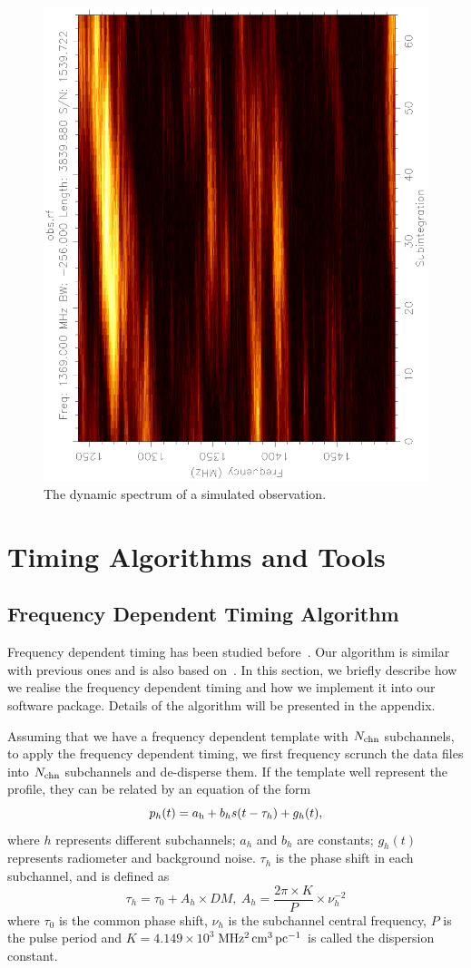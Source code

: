 \documentclass[useAMS,usenatbib]{mn2e}
\begin{document}
\begin{figure}
\begin{center}
\includegraphics[width=2.5 in,angle=-90]{obsDyn.ps}
\end{center}
\caption{The dynamic spectrum of a simulated observation.}
\label{obs2}
\end{figure}

\section{Timing Algorithms and Tools}

\subsection{Frequency Dependent Timing Algorithm}

Frequency dependent timing has been studied before~\citep{Pennucci14,Liu14}. 
Our algorithm is similar with previous ones and is also based on~\citet{Taylor92}.
%
In this section, we briefly describe how we realise the frequency dependent 
timing and how we implement it into our software package. Details of the 
algorithm will be presented in the appendix.
%

Assuming that we have a frequency dependent template with $N_{\rm{chn}}$ subchannels, 
to apply the frequency dependent timing, we first frequency scrunch the data 
files into $N_{\rm{chn}}$ subchannels and de-disperse them.
%
If the template well represent the profile, they can be related by an 
equation of the form
%
\begin{equation}
p_{h}(t)=a_{\rm{h}}+b_{h}s(t-\tau_{h})+g_{h}(t),
\end{equation}
%
where $h$ represents different subchannels; $a_{h}$ and $b_{h}$ are constants; 
$g_{h}(t)$ represents radiometer and background noise.
%
$\tau_{h}$ is the phase shift in each subchannel, and is defined as
%
\begin{equation}
\tau_{h}=\tau_{0}+A_{h}\times DM,\ A_{h}=\frac{2\pi\times K}{P}\times\nu_{h}^{-2}
\end{equation}
%
where $\tau_{0}$ is the common phase shift, $\nu_{h}$ is the subchannel central 
frequency, $P$ is the pulse period and $K=4.149\times 10^{3}$\,$\rm{MHz^{2}\,cm^{3}\,pc^{-1}}$ 
is called the dispersion constant.
%
\end{document}

